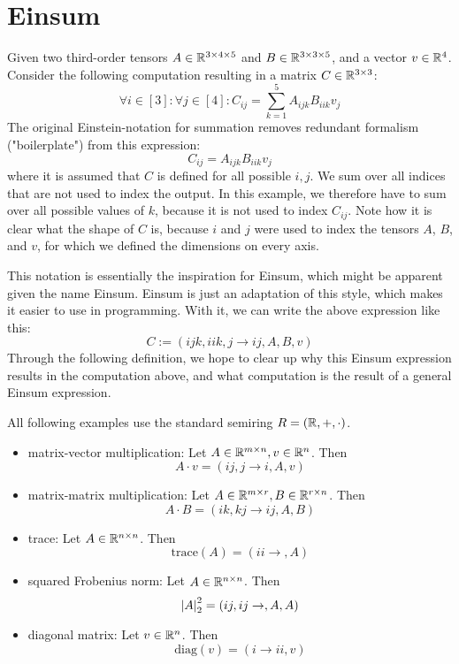 \chapter{Einsum}
\label{chap:einsum}

Given two third-order tensors $A \in \mathbb{R}^{3 \times 4 \times 5}$ and $B \in \mathbb{R}^{3 \times 3 \times 5}$, and a vector $v \in \mathbb{R}^4$.
Consider the following computation resulting in a matrix $C \in \mathbb{R}^{3 \times 3}$:
$$\forall i \in [3]: \forall j \in [4]: C_{ij} = \sum\limits_{k = 1}^{5} A_{ijk} B_{iik} v_j$$
The original Einstein-notation for summation removes redundant formalism ("boilerplate") from this expression:
$$C_{ij} = A_{ijk} B_{iik} v_j$$
where it is assumed that $C$ is defined for all possible $i,j$.
We sum over all indices that are not used to index the output.
In this example, we therefore have to sum over all possible values of $k$, because it is not used to index $C_{ij}$.
Note how it is clear what the shape of $C$ is, because $i$ and $j$ were used to index the tensors $A$, $B$, and $v$,
for which we defined the dimensions on every axis.

This notation is essentially the inspiration for Einsum, which might be apparent given the name Einsum.
Einsum is just an adaptation of this style, which makes it easier to use in programming.
With it, we can write the above expression like this:
$$C := (ijk, iik, j \rightarrow ij, A, B, v)$$
Through the following definition, we hope to clear up why this Einsum expression results in the computation above,
and what computation is the result of a general Einsum expression.



All following examples use the standard semiring $R = (\mathbb{R}, +, \cdot)$.
\begin{itemize}
    \item matrix-vector multiplication: Let $A \in \mathbb{R}^{m \times n}, v \in \mathbb{R}^{n}$. Then
          $$A \cdot v = (ij, j \rightarrow i, A, v)$$
    \item matrix-matrix multiplication: Let $A \in \mathbb{R}^{m \times r}, B \in \mathbb{R}^{r \times n}$. Then
          $$A \cdot B = (ik, kj \rightarrow ij, A, B)$$
    \item trace: Let $A \in \mathbb{R}^{n \times n}$. Then
          $$\text{trace}(A) = (ii \rightarrow, A)$$
    \item squared Frobenius norm: Let $A \in \mathbb{R}^{n \times n}$. Then
          $$\left\lvert A \right\rvert_2^2 = (ij, ij \rightarrow,A,A)$$
    \item diagonal matrix: Let $v \in \mathbb{R}^{n}$. Then
          $$\text{diag}(v) = (i \rightarrow ii, v)$$
\end{itemize}

